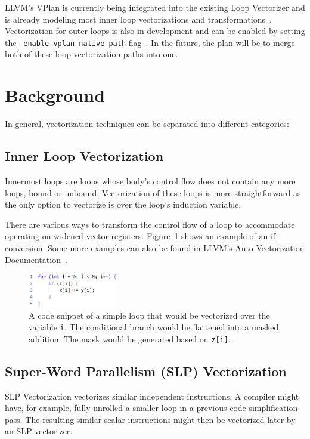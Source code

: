 \documentclass[sigplan,11pt,nonacm]{acmart}
\begin{document}
LLVM's VPlan is currently being integrated into the existing Loop Vectorizer and is
already modeling most inner loop vectorizations and transformations~\cite{llvmvplanupdate}. 
Vectorization for outer loops is also in development and can be enabled by setting 
the \texttt{-enable-vplan-native-path} flag~\cite{llvmouterloop}. In the future, the plan will 
be to merge both of these loop vectorization paths into one.




\section{Background}
\label{sec:background}
In general, vectorization techniques can be separated into different categories:

\subsection{Inner Loop Vectorization}
Innermost loops are loops whose body's control flow does not contain any more loops, bound or unbound.
Vectorization of these loops is more straightforward as the only option to vectorize is over 
the loop's induction variable.

There are various ways to transform the control flow of a loop to accommodate operating on widened
vector registers. Figure~\ref{fig:inner-loop-vec} shows an example of an if-conversion. Some more
examples can also be found in LLVM's Auto-Vectorization Documentation~\cite{llvmvec}.

\begin{figure}
  \centering
  \includegraphics[width=0.35\textwidth]{images/inner-loop-vec.png}
  \caption{A code snippet of a simple loop that would be vectorized over the variable \texttt{i}. 
  The conditional branch would be flattened into a masked addition. The mask would be generated 
  based on \texttt{z[i]}.}
  \label{fig:inner-loop-vec}
\end{figure}

\subsection{Super-Word Parallelism (SLP) Vectorization}
SLP Vectorization vectorizes similar independent instructions. A compiler might have, for example, 
fully unrolled a smaller loop in a previous code simplification pass. The resulting similar scalar 
instructions might then be vectorized later by an SLP vectorizer.
\end{document}
